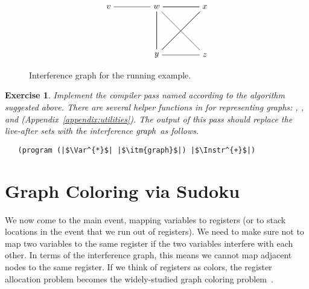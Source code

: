 \documentclass[11pt]{book}
\newtheorem{exercise}[theorem]{Exercise}
\begin{document}
\begin{figure}[tbp]
\large
\[
\begin{tikzpicture}[baseline=(current  bounding  box.center)]
\node (v) at (0,0)   {$v$};
\node (w) at (2,0)   {$w$};
\node (x) at (4,0)   {$x$};
\node (y) at (2,-2)  {$y$};
\node (z) at (4,-2)  {$z$};

\draw (v) to (w);
\foreach \i in {w,x,y} 
{
  \foreach \j in {w,x,y}
  { 
    \draw (\i) to (\j);
  }
}
\draw (z) to (w);
\draw (z) to (y);
\end{tikzpicture}
\]
\caption{Interference graph for the running example.}
\label{fig:interfere}
\end{figure}


\begin{exercise}\normalfont
Implement the compiler pass named  according
to the algorithm suggested above.  There are several helper functions
in  for representing graphs: ,
, and 
(Appendix~\ref{appendix:utilities}). The output of this pass should
replace the live-after sets with the interference $\mathit{graph}$ as
follows.
\begin{lstlisting}
   (program (|$\Var^{*}$| |$\itm{graph}$|) |$\Instr^{+}$|)
\end{lstlisting}

\end{exercise}

\section{Graph Coloring via Sudoku}

We now come to the main event, mapping variables to registers (or to
stack locations in the event that we run out of registers).  We need
to make sure not to map two variables to the same register if the two
variables interfere with each other.  In terms of the interference
graph, this means we cannot map adjacent nodes to the same register.
If we think of registers as colors, the register allocation problem
becomes the widely-studied graph coloring
problem~\citep{Balakrishnan:1996ve,Rosen:2002bh}.  
\end{document}
